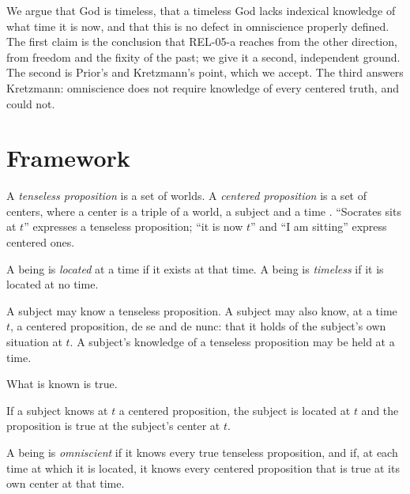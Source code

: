 \documentclass{situationist-preprint}
\begin{document}
We argue that God is timeless, that a timeless God lacks indexical knowledge of what time it is now, and that this is no defect in omniscience properly defined. The first claim is the conclusion that REL-05-a reaches from the other direction, from freedom and the fixity of the past; we give it a second, independent ground. The second is Prior's and Kretzmann's point, which we accept. The third answers Kretzmann: omniscience does not require knowledge of every centered truth, and could not.

\section{Framework}

\begin{definition}\label{d:props}
A \emph{tenseless proposition} is a set of worlds. A \emph{centered proposition} is a set of centers, where a center is a triple of a world, a subject and a time \citep{Lewis1979}. \enquote{Socrates sits at $t$} expresses a tenseless proposition; \enquote{it is now $t$} and \enquote{I am sitting} express centered ones.
\end{definition}

\begin{definition}\label{d:loc}
A being is \emph{located} at a time if it exists at that time. A being is \emph{timeless} if it is located at no time.
\end{definition}

\begin{definition}\label{d:know}
A subject may know a tenseless proposition. A subject may also know, at a time $t$, a centered proposition, de se and de nunc: that it holds of the subject's own situation at $t$. A subject's knowledge of a tenseless proposition may be held at a time.
\end{definition}

\begin{assumption}[Factivity]\label{a:fact}
What is known is true.
\end{assumption}

\begin{assumption}\label{a:cfact}
If a subject knows at $t$ a centered proposition, the subject is located at $t$ and the proposition is true at the subject's center at $t$.
\end{assumption}

\begin{definition}\label{d:omni}
A being is \emph{omniscient} if it knows every true tenseless proposition, and if, at each time at which it is located, it knows every centered proposition that is true at its own center at that time.
\end{definition}
\end{document}
